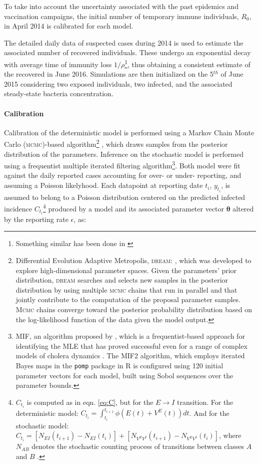  To take into account the uncertainty associated with the past epidemics and vaccination campaigns, the initial number of temporary immune individuals, $R_0$, in April 2014 is calibrated for each model.
 
 The detailed daily data of suspected cases during 2014 is used to estimate the associated number of recovered individuals. These undergo an exponential decay with average time of immunity loss $1/\rho$\footnote{Something similar has been done in \parencite{Pasetto:RealtimeProjectionsCholera:2017}}, thus obtaining a consistent estimate of the recovered in June 2016. Simulations are then initialized on the 5$^{th}$ of June 2015 considering two exposed individuals, two infected, and the associated steady-state bacteria concentration. 
 
\paragraph{Calibration} Calibration of the deterministic model is performed using a Markov Chain Monte Carlo (\textsc{mcmc})-based algorithm\footnote{Differential Evolution Adaptive Metropolis, \textsc{dream}: \parencite{Vrugt:MarkovChainMonte:2016}, which was developed to explore high-dimensional parameter spaces. Given the parameters' prior distribution, \textsc{dream} searches and selects new samples in the posterior distribution by using multiple \textsc{mcmc} chains that run in parallel and that jointly contribute to the computation of the proposal parameter samples. \textsc{Mcmc} chains  converge toward the posterior probability distribution based on the log-likelihood function of the data given the model output.} , which draws samples from the posterior distribution of the parameters.
Inference on the stochastic model is performed using a frequentist multiple iterated filtering algorithm\footnote{MIF, an algorithm proposed by \parencite{Ionides:InferenceDynamicLatent:2015}, which is a frequentist-based approach for identifying the MLE that has proved successful even for a range of complex models of cholera dynamics \parencite{King:InapparentInfectionsCholera:2008,Baracchini:SeasonalityCholeraDynamics:2017}. The MIF2 algorithm, which employs iterated Bayes maps in the \texttt{pomp} package in R \parencite{King:StatisticalInferencePartially:2015} is configured using 120 initial parameter vectors for each model, built using Sobol sequences over the parameter bounds.}. Both model were fit against the daily reported cases accounting for over- or under- reporting, and assuming a Poisson likelyhood. Each datapoint at reporting date $t_i$,  $y_{t_i}$, is assumed to belong to a Poisson distribution centered on the predicted infected incidence $C_{t_i}$\footnote{$C_{t_i}$ is computed as in  eqn. \eqref{eq:C}, but for the $E \rightarrow I$ transition. For the deterministic model: $ C_{t_i} = \int_{t_i}^{t_{i+1}} \phi \left(E(t) + V^E(t)\right) dt$. And for the stochastic model: $ C_{t_i} = [N_{EI}(t_{i+1}) - N_{EI}(t_i)] + [N_{V^EV^I}(t_{i+1}) - N_{V^EV^I}(t_i)] $, where $N_{AB}$ denotes the stochastic counting process of transitions between classes $A$ and $B$ .} produced by a model and its associated parameter vector $\boldsymbol{\theta}$ altered by the reporting rate $\epsilon$, as:
